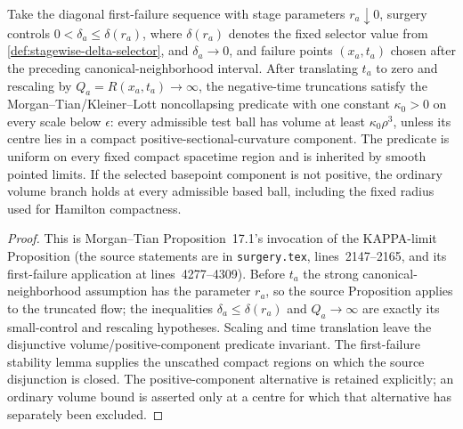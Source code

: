 \begin{lemma}
\label{lem:pre-failure-kappa-limit}
\notready
Take the diagonal first-failure sequence with stage parameters
$r_a\downarrow0$, surgery controls $0<\delta_a\le\delta(r_a)$, where
$\delta(r_a)$ denotes the fixed selector value from
\ref{def:stagewise-delta-selector}, and
$\delta_a\to0$, and failure points $(x_a,t_a)$ chosen after the preceding
canonical-neighborhood interval.  After translating $t_a$ to zero and
rescaling by $Q_a=R(x_a,t_a)\to\infty$, the negative-time truncations satisfy
the Morgan--Tian/Kleiner--Lott noncollapsing predicate with one constant
$\kappa_0>0$ on every scale below $\epsilon$: every admissible test ball has
volume at least $\kappa_0\rho^3$, unless its centre lies in a compact
positive-sectional-curvature component.  The predicate is uniform on every
fixed compact spacetime region and is inherited by smooth pointed limits.
If the selected basepoint component is not positive, the ordinary volume
branch holds at every admissible based ball, including the fixed radius used
for Hamilton compactness.
\end{lemma}

\begin{proof}
This is Morgan--Tian Proposition~17.1's invocation of the KAPPA-limit
Proposition (the source statements are in \texttt{surgery.tex},
lines~2147--2165, and its first-failure application at lines~4277--4309).
Before $t_a$ the strong canonical-neighborhood assumption has the parameter
$r_a$, so the source Proposition applies to the truncated flow; the
inequalities $\delta_a\le\delta(r_a)$ and $Q_a\to\infty$ are exactly its
small-control and rescaling hypotheses.  Scaling and time translation leave
the disjunctive volume/positive-component predicate invariant.  The
first-failure stability lemma supplies the unscathed compact regions on which
the source disjunction is closed.  The positive-component alternative is retained
explicitly; an ordinary volume bound is asserted only at a centre for which
that alternative has separately been excluded.
\end{proof}

